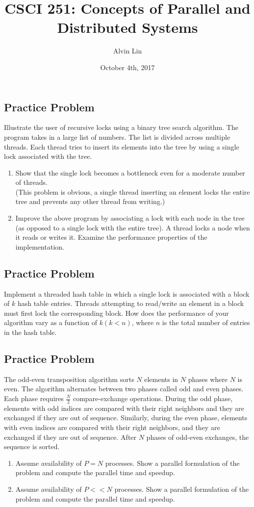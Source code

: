 \documentclass{math}
\title{CSCI 251: Concepts of Parallel and Distributed Systems}
\author{Alvin Lin}
\date{October 4th, 2017}
\begin{document}
\maketitle

\subsection*{Practice Problem}
Illustrate the user of recursive locks using a binary tree search algorithm.
The program takes in a large list of numbers. The list is divided across
multiple threads. Each thread tries to insert its elements into the tree by
using a single lock associated with the tree.
\begin{enumerate}
  \item Show that the single lock becomes a bottleneck even for a moderate
  number of threads. \\
  (This problem is obvious, a single thread inserting an element locks the
  entire tree and prevents any other thread from writing.)
  \item Improve the above program by associating a lock with each node in the
  tree (as opposed to a single lock with the entire tree). A thread locks a node
  when it reads or writes it. Examine the performance properties of the
  implementation.
\end{enumerate}

\subsection*{Practice Problem}
Implement a threaded hash table in which a single lock is associated with a
block of \( k \) hash table entries. Threads attempting to read/write an element
in a block must first lock the corresponding block. How does the performance
of your algorithm vary as a function of \( k (k<n) \), where \( n \) is the
total number of entries in the hash table.

\subsection*{Practice Problem}
The odd-even transposition algorithm sorts \( N \) elements in \( N \) phases
where \( N \) is even. The algorithm alternates between two phases called odd
and even phases. Each phase requires \( \frac{N}{2} \) compare-exchange
operations. During the odd phase, elements with odd indices are compared with
their right neighbors and they are exchanged if they are out of sequence.
Similarly, during the even phase, elements with even indices are compared with
their right neighbors, and they are exchanged if they are out of sequence. After
\( N \) phases of odd-even exchanges, the sequence is sorted.
\begin{enumerate}
  \item Assume availability of \( P = N \) processes. Show a parallel
  formulation of the problem and compute the parallel time and speedup.
  \item Assume availability of \( P << N \) processes. Show a parallel
  formulation of the problem and compute the parallel time and speedup.
\end{enumerate}
\end{document}
